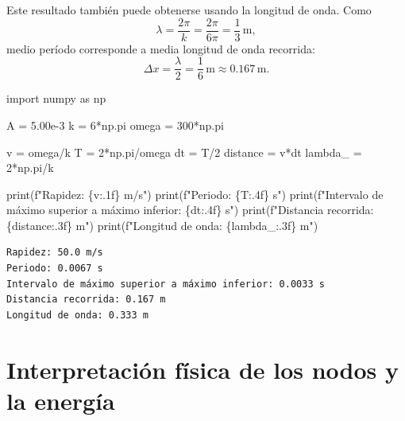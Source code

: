 \documentclass[
  letterpaper,
  DIV=11,
  numbers=noendperiod]{scrreprt}
\newenvironment{Shaded}{\begin{snugshade}}{\end{snugshade}}
\newcommand{\BuiltInTok}[1]{\textcolor[rgb]{0.00,0.23,0.31}{#1}}
\newcommand{\DecValTok}[1]{\textcolor[rgb]{0.68,0.00,0.00}{#1}}
\newcommand{\FloatTok}[1]{\textcolor[rgb]{0.68,0.00,0.00}{#1}}
\newcommand{\ImportTok}[1]{\textcolor[rgb]{0.00,0.46,0.62}{#1}}
\newcommand{\NormalTok}[1]{\textcolor[rgb]{0.00,0.23,0.31}{#1}}
\newcommand{\OperatorTok}[1]{\textcolor[rgb]{0.37,0.37,0.37}{#1}}
\newcommand{\SpecialCharTok}[1]{\textcolor[rgb]{0.37,0.37,0.37}{#1}}
\newcommand{\SpecialStringTok}[1]{\textcolor[rgb]{0.13,0.47,0.30}{#1}}
\begin{document}
Este resultado también puede obtenerse usando la longitud de onda. Como
\[
\lambda=\frac{2\pi}{k}=\frac{2\pi}{6\pi}=\frac{1}{3}\,\text{m},
\] medio período corresponde a media longitud de onda recorrida: \[
\Delta x=\frac{\lambda}{2}=\frac{1}{6}\,\text{m}\approx 0.167\,\text{m}.
\]

\begin{Shaded}
\begin{Highlighting}[]
\ImportTok{import}\NormalTok{ numpy }\ImportTok{as}\NormalTok{ np}

\NormalTok{A }\OperatorTok{=} \FloatTok{5.00e{-}3}
\NormalTok{k }\OperatorTok{=} \DecValTok{6}\OperatorTok{*}\NormalTok{np.pi}
\NormalTok{omega }\OperatorTok{=} \DecValTok{300}\OperatorTok{*}\NormalTok{np.pi}

\NormalTok{v }\OperatorTok{=}\NormalTok{ omega}\OperatorTok{/}\NormalTok{k}
\NormalTok{T }\OperatorTok{=} \DecValTok{2}\OperatorTok{*}\NormalTok{np.pi}\OperatorTok{/}\NormalTok{omega}
\NormalTok{dt }\OperatorTok{=}\NormalTok{ T}\OperatorTok{/}\DecValTok{2}
\NormalTok{distance }\OperatorTok{=}\NormalTok{ v}\OperatorTok{*}\NormalTok{dt}
\NormalTok{lambda\_ }\OperatorTok{=} \DecValTok{2}\OperatorTok{*}\NormalTok{np.pi}\OperatorTok{/}\NormalTok{k}

\BuiltInTok{print}\NormalTok{(}\SpecialStringTok{f"Rapidez: }\SpecialCharTok{\{}\NormalTok{v}\SpecialCharTok{:.1f\}}\SpecialStringTok{ m/s"}\NormalTok{)}
\BuiltInTok{print}\NormalTok{(}\SpecialStringTok{f"Periodo: }\SpecialCharTok{\{}\NormalTok{T}\SpecialCharTok{:.4f\}}\SpecialStringTok{ s"}\NormalTok{)}
\BuiltInTok{print}\NormalTok{(}\SpecialStringTok{f"Intervalo de máximo superior a máximo inferior: }\SpecialCharTok{\{}\NormalTok{dt}\SpecialCharTok{:.4f\}}\SpecialStringTok{ s"}\NormalTok{)}
\BuiltInTok{print}\NormalTok{(}\SpecialStringTok{f"Distancia recorrida: }\SpecialCharTok{\{}\NormalTok{distance}\SpecialCharTok{:.3f\}}\SpecialStringTok{ m"}\NormalTok{)}
\BuiltInTok{print}\NormalTok{(}\SpecialStringTok{f"Longitud de onda: }\SpecialCharTok{\{}\NormalTok{lambda\_}\SpecialCharTok{:.3f\}}\SpecialStringTok{ m"}\NormalTok{)}
\end{Highlighting}
\end{Shaded}

\begin{verbatim}
Rapidez: 50.0 m/s
Periodo: 0.0067 s
Intervalo de máximo superior a máximo inferior: 0.0033 s
Distancia recorrida: 0.167 m
Longitud de onda: 0.333 m
\end{verbatim}

\section{Interpretación física de los nodos y la
energía}\label{interpretaciuxf3n-fuxedsica-de-los-nodos-y-la-energuxeda}
\end{document}
